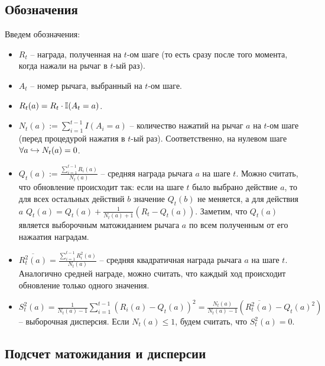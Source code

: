 \subsection{Обозначения}

Введем обозначения:
\begin{itemize}
    \item $R_t$ -- награда, полученная на $t$-ом шаге (то есть сразу после того момента, когда нажали на рычаг в $t$-ый раз).
    \item $A_t$ -- номер рычага, выбранный на $t$-ом шаге.
    \item $R_t(a) = R_t \cdot \mathbb{I}(A_t = a)$.
    \item $N_t(a) := \sum_{i=1}^{t-1} I(A_i = a)$ -- количество нажатий на рычаг $a$ на $t$-ом шаге (перед процедурой нажатия в $t$-ый раз). Соответственно, на нулевом шаге $\forall a \hookrightarrow N_t(a) = 0$.
    \item $Q_t(a) := \frac{\sum_{i=1}^{t-1} R_i(a)}{N_t(a)}$ -- средняя награда рычага $a$ на шаге $t$. Можно считать, что обновление происходит так: если на шаге $t$ было выбрано действие $a$, то для всех остальных действий $b$ значение $Q_t(b)$ не меняется, а для действия $a$ $Q_t(a) = Q_t(a) + \frac{1}{N_{t}(a) + 1}(R_t - Q_t(a))$. Заметим, что $Q_t(a)$ является выборочным матожиданием рычага $a$ по всем полученным от его нажаатия наградам.
    \item $\overline{R_t^2(a)} = \frac{\sum_{i=1}^{t-1} R_i^2(a)}{N_t(a)}$ -- средняя квадратичная награда рычага $a$ на шаге $t$. Аналогично средней награде, можно считать, что каждый ход происходит обновление только одного значения.
    \item $S_t^2(a) = \frac{1}{N_t(a) - 1}\sum_{i=1}^{t-1}(R_i(a) - Q_t(a))^2 = \frac{N_t(a)}{N_t(a) - 1}(\overline{R_t^2(a)} - Q_t(a)^2)$ -- выборочная дисперсия. Если $N_t(a) \leq 1$, будем считать, что $S_t^2(a) = 0$.
\end{itemize}

\subsection{Подсчет матожидания и дисперсии}

